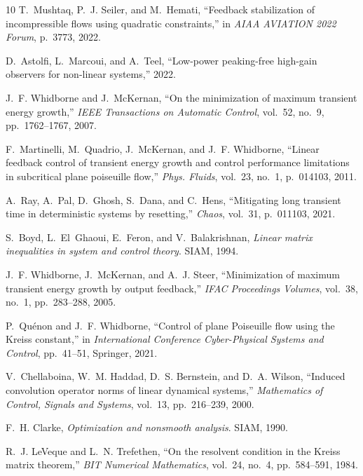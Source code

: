 \documentclass[12pt, a4paper,reqno]{amsart}
\theoremstyle{definition}
\begin{document}
\begin{thebibliography}{10}
T.~Mushtaq, P.~J. Seiler, and M.~Hemati, ``Feedback stabilization of
  incompressible flows using quadratic constraints,'' in {\em AIAA AVIATION
  2022 Forum}, p.~3773, 2022.

D.~Astolfi, L.~Marcoui, and A.~Teel, ``Low-power peaking-free high-gain
  observers for non-linear systems,'' 2022.

J.~F. Whidborne and J.~McKernan, ``On the minimization of maximum transient
  energy growth,'' {\em IEEE Transactions on Automatic Control}, vol.~52,
  no.~9, pp.~1762--1767, 2007.

F.~Martinelli, M.~Quadrio, J.~McKernan, and J.~F. Whidborne, ``Linear feedback
  control of transient energy growth and control performance limitations in
  subcritical plane poiseuille flow,'' {\em Phys. Fluids}, vol.~23, no.~1,
  p.~014103, 2011.

A.~Ray, A.~Pal, D.~Ghosh, S.~Dana, and C.~Hens, ``Mitigating long transient
  time in deterministic systems by resetting,'' {\em Chaos}, vol.~31,
  p.~011103, 2021.

S.~Boyd, L.~El~Ghaoui, E.~Feron, and V.~Balakrishnan, {\em Linear matrix
  inequalities in system and control theory}.
\newblock SIAM, 1994.

J.~F. Whidborne, J.~McKernan, and A.~J. Steer, ``Minimization of maximum
  transient energy growth by output feedback,'' {\em IFAC Proceedings Volumes},
  vol.~38, no.~1, pp.~283--288, 2005.

P.~Qu{\'e}non and J.~F. Whidborne, ``Control of plane {P}oiseuille flow using
  the {K}reiss constant,'' in {\em International Conference Cyber-Physical
  Systems and Control}, pp.~41--51, Springer, 2021.

V.~Chellaboina, W.~M. Haddad, D.~S. Bernstein, and D.~A. Wilson, ``Induced
  convolution operator norms of linear dynamical systems,'' {\em Mathematics of
  Control, Signals and Systems}, vol.~13, pp.~216--239, 2000.

F.~H. Clarke, {\em Optimization and nonsmooth analysis}.
\newblock SIAM, 1990.

R.~J. LeVeque and L.~N. Trefethen, ``On the resolvent condition in the {K}reiss
  matrix theorem,'' {\em BIT Numerical Mathematics}, vol.~24, no.~4,
  pp.~584--591, 1984.


\end{thebibliography}
\end{document}
